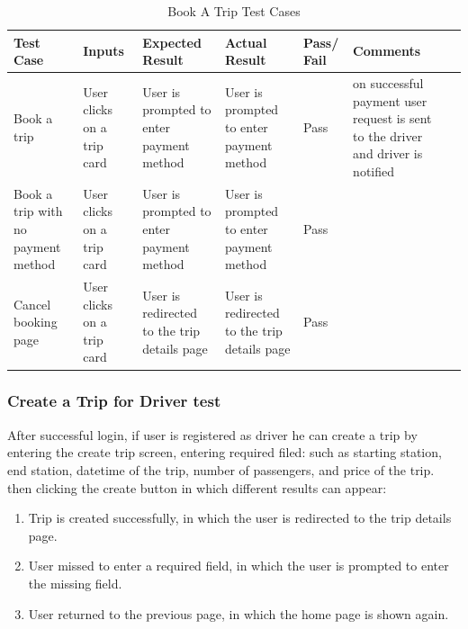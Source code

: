 \documentclass[a4paper, 12pt]{report} %
\begin{document}
                \begin{spacing}{1}
                    \begin{table}[H]
                        \centering
                        \label{tab:login_test}
                        \begin{tabularx}{\textwidth}{| R{2cm}|R{3cm}|R{2cm}|R{2cm}|R{2cm}|R{2cm}|R{2cm}|}
                            \hline
                             \textbf{Test Case} & \textbf{Inputs} & \textbf{Expected Result} & \textbf{Actual Result} & \textbf{Pass/ Fail} & \textbf{Comments} \\
                            \hline
                            Book a trip & User clicks on a trip card & User is prompted to enter payment method & User is prompted to enter payment method & Pass & on successful payment user request is sent to the driver and driver is notified\\
                            \hline
                            Book a trip with no payment method & User clicks on a trip card & User is prompted to enter payment method & User is prompted to enter payment method & Pass & \\
                            \hline
                            Cancel booking page & User clicks on a trip card & User is redirected to the trip details page & User is redirected to the trip details page & Pass & \\
                            \hline
                        \end{tabularx}
                        \caption{Book A Trip Test Cases}
                    \end{table}
                \end{spacing}


            \subsubsection{Create a Trip for Driver test}
                After successful login, if user is registered as driver he can create a trip by entering the create trip screen, entering required filed: such as starting station, end station, datetime of the trip, number of passengers, and price of the trip.
                then clicking the create button in which different results can appear:
                \begin{enumerate}
                    \item Trip is created successfully, in which the user is redirected to the trip details page.
                    \item User missed to enter a required field, in which the user is prompted to enter the missing field.
                    \item User returned to the previous page, in which the home page is shown again.
                \end{enumerate}
\end{document}
